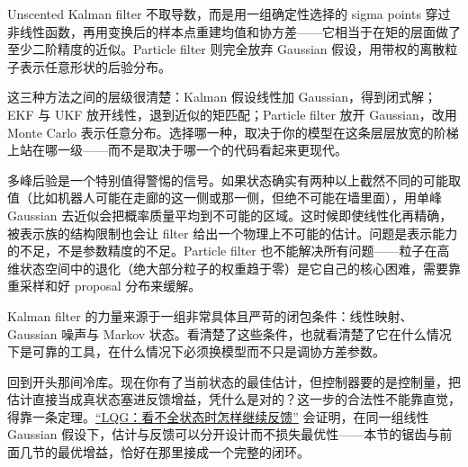 Unscented Kalman filter 不取导数，而是用一组确定性选择的 sigma points 穿过非线性函数，再用变换后的样本点重建均值和协方差——它相当于在矩的层面做了至少二阶精度的近似。Particle filter 则完全放弃 Gaussian 假设，用带权的离散粒子表示任意形状的后验分布。

这三种方法之间的层级很清楚：Kalman 假设线性加 Gaussian，得到闭式解；EKF 与 UKF 放开线性，退到近似的矩匹配；Particle filter 放开 Gaussian，改用 Monte Carlo 表示任意分布。选择哪一种，取决于你的模型在这条层层放宽的阶梯上站在哪一级——而不是取决于哪一个的代码看起来更现代。

多峰后验是一个特别值得警惕的信号。如果状态确实有两种以上截然不同的可能取值（比如机器人可能在走廊的这一侧或那一侧，但绝不可能在墙里面），用单峰 Gaussian 去近似会把概率质量平均到不可能的区域。这时候即使线性化再精确，被表示族的结构限制也会让 filter 给出一个物理上不可能的估计。问题是表示能力的不足，不是参数精度的不足。Particle filter 也不能解决所有问题——粒子在高维状态空间中的退化（绝大部分粒子的权重趋于零）是它自己的核心困难，需要靠重采样和好 proposal 分布来缓解。

Kalman filter 的力量来源于一组非常具体且严苛的闭包条件：线性映射、Gaussian 噪声与 Markov 状态。看清楚了这些条件，也就看清楚了它在什么情况下是可靠的工具，在什么情况下必须换模型而不只是调协方差参数。

回到开头那间冷库。现在你有了当前状态的最佳估计，但控制器要的是控制量，把估计直接当成真状态塞进反馈增益，凭什么是对的？这一步的合法性不能靠直觉，得靠一条定理。\hyperref[sec:16-Control-and-Reinforcement-Learning/01-Optimal-Control/05]{``LQG：看不全状态时怎样继续反馈''} 会证明，在同一组线性 Gaussian 假设下，估计与反馈可以分开设计而不损失最优性——本节的锯齿与前面几节的最优增益，恰好在那里接成一个完整的闭环。
